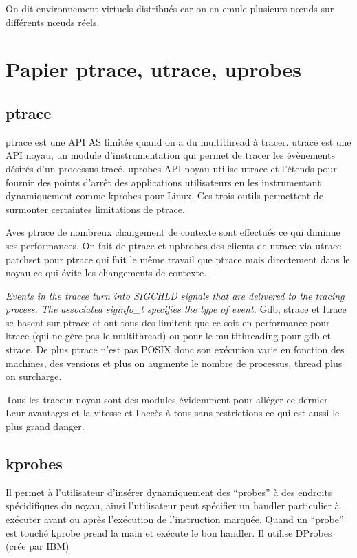 \documentclass{article}
\begin{document}
On dit environnement virtuels distribués car on en emule plusieurs n\oe uds sur
différents n\oe uds réels.

\section{Papier ptrace, utrace, uprobes}
\subsection{ptrace}
ptrace est une API AS limitée quand on a du multithread à tracer. utrace est une
API noyau, un module d'instrumentation qui permet de tracer les évènements
désirés d'un processus tracé. uprobes API noyau utilise utrace et l'étends pour
fournir des points d'arrêt des applications utilisateurs en les instrumentant
dynamiquement comme kprobes pour Linux. Ces trois outils permettent de surmonter
certaintes limitations de ptrace.

Aves ptrace de nombreux changement de contexte sont effectués ce qui diminue ses
performances. On fait de ptrace et upbrobes des clients de utrace via utrace
patchset pour ptrace qui fait le même travail que ptrace mais directement dans
le noyau ce qui évite les changements de contexte.

\textit{Events in the tracee turn into SIGCHLD signals that are delivered to the
  tracing process. The associated siginfo_t specifies the type of event.}
Gdb, strace et ltrace se basent sur ptrace et ont tous des limitent que ce soit en performance pour ltrace (qui ne gère pas le multithread) ou pour le multithreading pour gdb et strace. De plus ptrace n'est pas POSIX donc son exécution varie en fonction des machines, des versions et plus on augmente le nombre de processus, thread plus on surcharge.

Tous les traceur noyau sont des modules évidemment pour alléger ce dernier. Leur avantages et la vitesse et l'accès à tous sans restrictions ce qui est aussi le plus grand danger.

\subsection{kprobes}
Il permet à l'utilisateur d'insérer dynamiquement des ``probes'' à des endroits spécidifiques du noyau, ainsi l'utilisateur peut spécifier un handler particulier à exécuter avant ou après l'exécution de l'instruction marquée. Quand un ``probe'' est touché kprobe prend la main et exécute le bon handler. Il utilise DProbes (crée par IBM)
\end{document}
